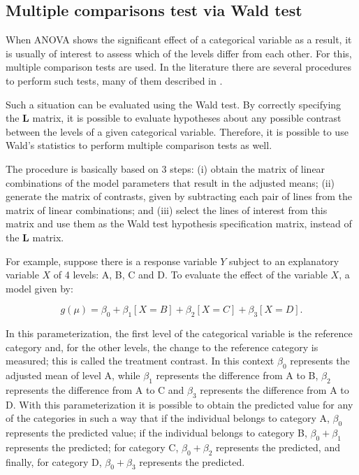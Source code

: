 \documentclass[article]{jss}\usepackage[]{graphicx}\usepackage[]{xcolor}
\begin{document}
\subsection{Multiple comparisons test via Wald test}

When ANOVA shows the significant effect of a categorical variable as a result, it is usually of interest to assess which of the levels differ from each other. For this, multiple comparison tests are used. In the literature there are several procedures to perform such tests, many of them described in \citet{hsu1996multiple}.

Such a situation can be evaluated using the Wald test. By correctly specifying the $\boldsymbol{L}$ matrix, it is possible to evaluate hypotheses about any possible contrast between the levels of a given categorical variable. Therefore, it is possible to use Wald's statistics to perform multiple comparison tests as well.

The procedure is basically based on 3 steps: (i) obtain the matrix of linear combinations of the model parameters that result in the adjusted means; (ii) generate the matrix of contrasts, given by subtracting each pair of lines from the matrix of linear combinations; and (iii) select the lines of interest from this matrix and use them as the Wald test hypothesis specification matrix, instead of the $\boldsymbol{L}$ matrix.
	
For example, suppose there is a response variable $Y$ subject to an explanatory variable $X$ of 4 levels: A, B, C and D. To evaluate the effect of the variable $X$, a model given by:

$$g(\mu) = \beta_0 + \beta_1[X=B] + \beta_2[X=C] + \beta_3[X=D].$$

\noindent In this parameterization, the first level of the categorical variable is the reference category and, for the other levels, the change to the reference category is measured; this is called the treatment contrast. In this context $\beta_0$ represents the adjusted mean of level A, while $\beta_1$ represents the difference from A to B, $\beta_2$ represents the difference from A to C and $\beta_3$ represents the difference from A to D. With this parameterization it is possible to obtain the predicted value for any of the categories in such a way that if the individual belongs to category A, $\beta_0$ represents the predicted value; if the individual belongs to category B, $\beta_0 + \beta_1$ represents the predicted; for category C, $\beta_0 + \beta_2$ represents the predicted, and finally, for category D, $\beta_0 + \beta_3$ represents the predicted.
\end{document}
